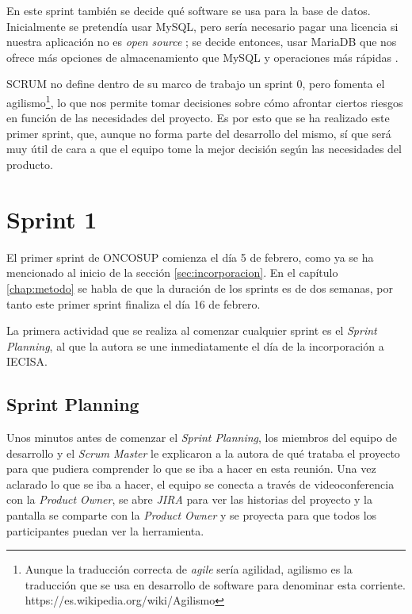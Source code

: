 En este sprint también se decide qué software se usa para la base de datos. Inicialmente se pretendía usar MySQL, pero sería necesario pagar una licencia si nuestra aplicación no es \emph{open source} \cite{mysqlpago}; se decide entonces, usar MariaDB que nos ofrece más opciones de almacenamiento que MySQL y operaciones más rápidas \cite{mdbfeatures}.

SCRUM no define dentro de su marco de trabajo un sprint 0, pero fomenta el agilismo\footnote{Aunque la traducción correcta de \emph{agile} sería agilidad, agilismo es la traducción que se usa en desarrollo de software para denominar esta corriente. https://es.wikipedia.org/wiki/Agilismo}, lo que nos permite tomar decisiones sobre cómo afrontar ciertos riesgos en función de las necesidades del proyecto. Es por esto que se ha realizado este primer sprint, que, aunque no forma parte del desarrollo del mismo, sí que será muy útil de cara a que el equipo tome la mejor decisión según las necesidades del producto.


\section{Sprint 1}
\label{sec:sprint1}

El primer sprint de ONCOSUP comienza el día 5 de febrero, como ya se ha mencionado al inicio de la sección \ref{sec:incorporacion}. En el capítulo \ref{chap:metodo} se habla de que la duración de los sprints es de dos semanas, por tanto este primer sprint finaliza el día 16 de febrero.

La primera actividad que se realiza al comenzar cualquier sprint es el \emph{Sprint Planning}, al que la autora se une inmediatamente el día de la incorporación a IECISA. 

\subsection{Sprint Planning}
\label{subsec:S1-SP}
Unos minutos antes de comenzar el \emph{Sprint Planning}, los miembros del equipo de desarrollo y el \emph{Scrum Master} le explicaron a la autora de qué trataba el proyecto para que pudiera comprender lo que se iba a hacer en esta reunión. Una vez aclarado lo que se iba a hacer, el equipo se conecta a través de videoconferencia con la \emph{Product Owner}, se abre \emph{JIRA} para ver las historias del proyecto y la pantalla se comparte con la \emph{Product Owner} y se proyecta para que todos los participantes puedan ver la herramienta.


